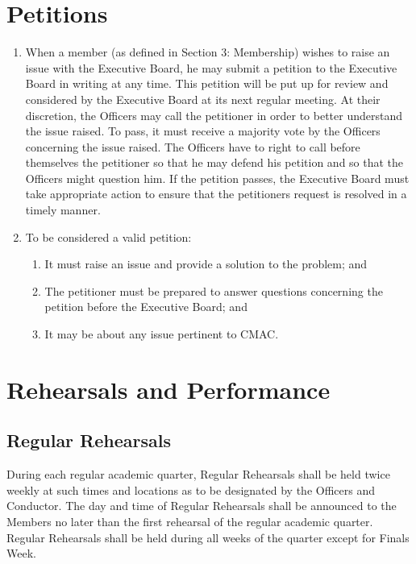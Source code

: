 \documentclass{article}
\begin{document}
\section{Petitions}
\begin{enumerate}
\item When a member (as defined in Section 3: Membership) wishes to raise
an issue with the Executive Board, he may submit a petition to the
Executive Board in writing at any time. This petition will be put
up for review and considered by the Executive Board at its next regular
meeting. At their discretion, the Officers may call the petitioner
in order to better understand the issue raised. To pass, it must receive
a majority vote by the Officers concerning the issue raised. The Officers
have to right to call before themselves the petitioner so that he
may defend his petition and so that the Officers might question him.
If the petition passes, the Executive Board must take appropriate
action to ensure that the petitioners request is resolved in a timely
manner.
\item To be considered a valid petition:

\begin{enumerate}
\item It must raise an issue and provide a solution to the problem; and
\item The petitioner must be prepared to answer questions concerning the
petition before the Executive Board; and
\item It may be about any issue pertinent to CMAC.
\end{enumerate}
\end{enumerate}

\section{Rehearsals and Performance}

\subsection{Regular Rehearsals}

During each regular academic quarter, Regular Rehearsals shall be
held twice weekly at such times and locations as to be designated
by the Officers and Conductor. The day and time of Regular Rehearsals
shall be announced to the Members no later than the first rehearsal
of the regular academic quarter. Regular Rehearsals shall be held
during all weeks of the quarter except for Finals Week.
\end{document}

